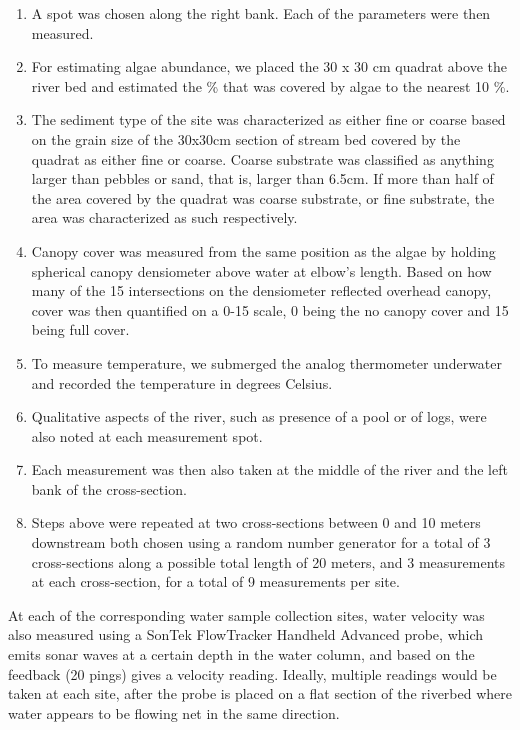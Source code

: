 \documentclass{article}
\begin{document}
\begin{enumerate}
\item A spot was chosen along the right bank. Each of the parameters were then measured.
\item For estimating algae abundance, we placed the 30  x 30 cm quadrat above the river bed and estimated the \% that was covered by algae to the nearest 10 \%.

\item The sediment type of the site was characterized as either fine or coarse based on the grain size of the 30x30cm section of stream bed covered by the quadrat as either fine or coarse. Coarse substrate was classified as anything larger than pebbles or sand, that is, larger than 6.5cm. If more than half of the area covered by the quadrat was coarse substrate, or fine substrate, the area was characterized as such respectively.

\item Canopy cover was measured from the same position as the algae by holding spherical canopy densiometer above water at elbow's length. Based on how many of the 15 intersections on the densiometer reflected overhead canopy, cover was then quantified on a 0-15 scale, 0 being the no canopy cover and 15 being full cover.

\item To measure temperature, we submerged the analog thermometer underwater and recorded the temperature in degrees Celsius.

\item Qualitative aspects of the river, such as presence of a pool or of logs, were also noted at each measurement spot.

\item Each measurement was then also taken at the middle of the river and the left bank of the cross-section. 

\item Steps above were repeated at two cross-sections between 0 and 10 meters downstream both chosen using a random number generator for a total of 3 cross-sections along a possible total length of 20 meters, and 3 measurements at each cross-section, for a total of 9 measurements per site. 
\end{enumerate}

At each of the corresponding water sample collection sites, water velocity was also measured using a SonTek FlowTracker Handheld Advanced probe, which emits sonar waves at a certain depth in the water column, and based on the feedback (20 pings) gives a velocity reading. Ideally, multiple readings would be taken at each site, after the probe is placed on a flat section of the riverbed where water appears to be flowing net in the same direction. 
\end{document}
